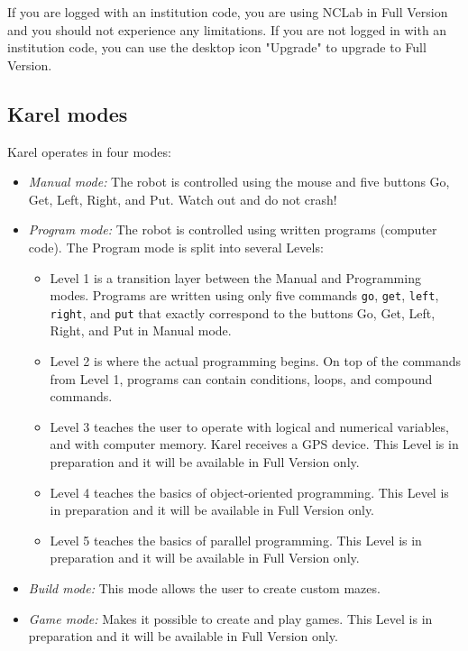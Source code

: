 \documentclass[article,A4,12pt]{llncs}
\begin{document}
If you are logged with an institution code, you are using NCLab in 
Full Version and you should not experience any limitations. If you are 
not logged in with an institution code, you can use the desktop icon "Upgrade" 
to upgrade to Full Version.

\subsection{Karel modes}

Karel operates in four modes:
\begin{itemize}
\item {\em Manual mode:} The robot is controlled using the mouse and five buttons Go, Get, Left, Right, and Put. 
      Watch out and do not crash!
\item {\em Program mode:} The robot is controlled using written programs (computer code). The Program mode is 
      split into several Levels:
\begin{itemize}
\item Level 1 is a transition layer between the Manual and Programming modes. Programs are written using only 
      five commands {\tt go}, {\tt get}, {\tt left}, {\tt right}, and {\tt put} that exactly correspond to 
      the buttons Go, Get, Left, Right, and Put in Manual mode.
\item Level 2 is where the actual programming begins. On top of the commands from Level 1, programs can contain 
      conditions, loops, and compound commands.
\item Level 3 teaches the user to operate with logical and numerical variables, and with computer memory. Karel  
      receives a GPS device. This Level is in preparation and it will be available in Full Version only.
\item Level 4 teaches the basics of object-oriented programming. This Level is in preparation and it will be available in Full Version only.
\item Level 5 teaches the basics of parallel programming. This Level is in preparation and it will be available in Full Version only.
\end{itemize}
\item {\em Build mode:} This mode allows the user to create custom mazes.
\item {\em Game mode:} Makes it possible to create and play games. This Level is in preparation and it will be available in Full Version only.
\end{itemize}
\end{document}
